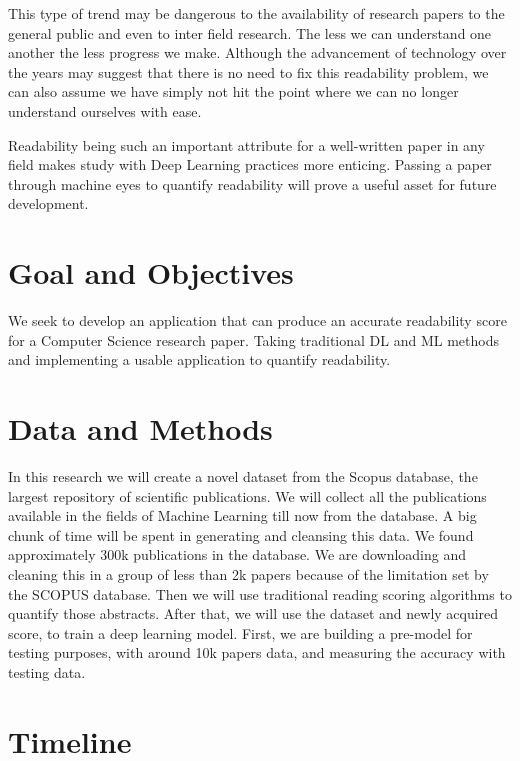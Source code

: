 \documentclass[letterpaper]{article}
\begin{document}
\par 
This type of trend may be dangerous to the availability of research papers to the general public and even to inter field research. The less we can understand one another the less progress we make. Although the advancement of technology over the years may suggest that there is no need to fix this readability problem, we can also assume we have simply not hit the point where we can no longer understand ourselves with ease.
\par
Readability being such an important attribute for a well-written paper in any field makes study with Deep Learning practices more enticing. Passing a paper through machine eyes to quantify readability will prove a useful asset for future development.


\section*{Goal and Objectives}
 We seek to develop an application that can produce an accurate readability score for a Computer Science research paper. Taking traditional DL and ML methods and implementing a usable application to quantify readability.

\section*{Data and Methods}
In this research we will create a novel dataset from the Scopus database, the largest repository of scientific publications. We will collect all the publications available in the fields of Machine Learning till now from the database. A big chunk of time will be spent in generating and cleansing this data. We found approximately 300k publications in the database. We are downloading and cleaning this in a group of less than 2k papers because of the limitation set by the SCOPUS database. Then we will use traditional reading scoring algorithms to quantify those abstracts. After that, we will use the dataset and newly acquired score, to train a deep learning model. First, we are building a pre-model for testing purposes, with around 10k papers data, and measuring the accuracy with testing data.

\section*{Timeline}
\end{document}
